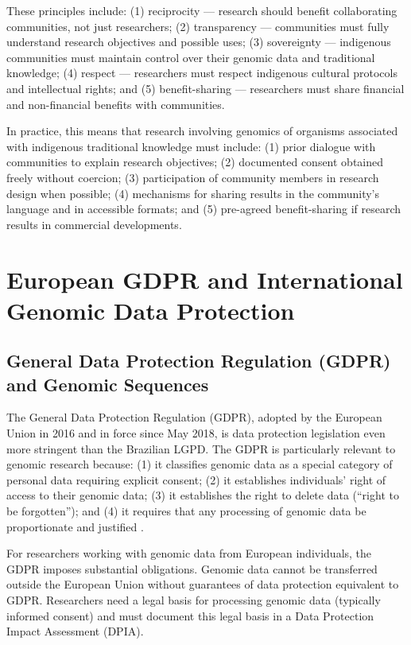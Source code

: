 These principles include: (1) reciprocity --- research should benefit collaborating communities, not just researchers; (2) transparency --- communities must fully understand research objectives and possible uses; (3) sovereignty --- indigenous communities must maintain control over their genomic data and traditional knowledge; (4) respect --- researchers must respect indigenous cultural protocols and intellectual rights; and (5) benefit-sharing --- researchers must share financial and non-financial benefits with communities.

In practice, this means that research involving genomics of organisms associated with indigenous traditional knowledge must include: (1) prior dialogue with communities to explain research objectives; (2) documented consent obtained freely without coercion; (3) participation of community members in research design when possible; (4) mechanisms for sharing results in the community's language and in accessible formats; and (5) pre-agreed benefit-sharing if research results in commercial developments.

\section{European GDPR and International Genomic Data Protection}

\subsection{General Data Protection Regulation (GDPR) and Genomic Sequences}

The General Data Protection Regulation (GDPR), adopted by the European Union in 2016 and in force since May 2018, is data protection legislation even more stringent than the Brazilian LGPD. The GDPR is particularly relevant to genomic research because: (1) it classifies genomic data as a special category of personal data requiring explicit consent; (2) it establishes individuals' right of access to their genomic data; (3) it establishes the right to delete data (``right to be forgotten''); and (4) it requires that any processing of genomic data be proportionate and justified \parencite{gdpr2018}.

For researchers working with genomic data from European individuals, the GDPR imposes substantial obligations. Genomic data cannot be transferred outside the European Union without guarantees of data protection equivalent to GDPR. Researchers need a legal basis for processing genomic data (typically informed consent) and must document this legal basis in a Data Protection Impact Assessment (DPIA).

